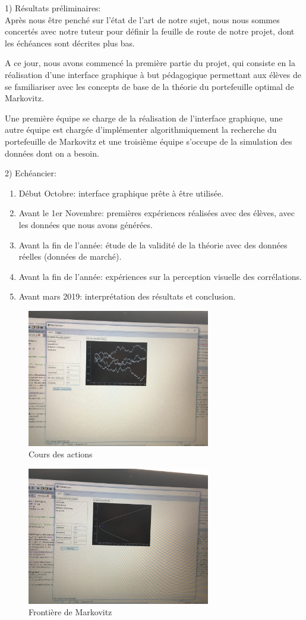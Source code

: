 \documentclass[10pt,a4paper]{article}
\begin{document}
1) Résultats préliminaires:\\

Après nous être penché sur l'état de l'art de notre sujet, nous nous sommes concertés avec notre tuteur pour définir la feuille de route de notre projet, dont les échéances sont décrites plus bas. 

A ce jour, nous avons commencé la première partie du projet, qui consiste en la réalisation d'une interface graphique à but pédagogique permettant aux élèves de se familiariser avec les concepts de base de la théorie du portefeuille optimal de Markovitz.

Une première équipe se charge de la réalisation de l'interface graphique, une autre équipe est chargée d'implémenter algorithmiquement la recherche du portefeuille de Markovitz et une troisième équipe s'occupe de la simulation des données dont on a besoin. 

2) Echéancier:\\
\begin{enumerate}
\item Début Octobre: interface graphique prête à être utilisée.
\item Avant le 1er Novembre: premières expériences réalisées avec des élèves, avec les données que nous avons générées. 
\item Avant la fin de l'année: étude de la validité de la théorie avec des données réelles (données de marché).
\item Avant la fin de l'année: expériences sur la perception visuelle des corrélations.
\item Avant mars 2019: interprétation des résultats et conclusion. 

\end{enumerate}

\begin{figure}[h!]
\centerline{
\includegraphics [width=8cm]{Im1.PNG}}
\caption{\label{} Cours des actions}
\end{figure} 

\begin{figure}[h!]
\centerline{
\includegraphics [width=8cm]{Im2.PNG}}
\caption{\label{} Frontière de Markovitz}
\end{figure} 
\end{document}
